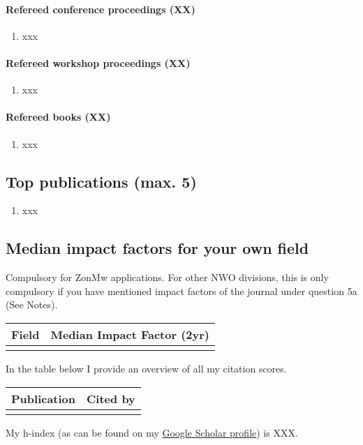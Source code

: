 \paragraph*{Refereed conference proceedings (XX)}

\begin{enumerate}[leftmargin=2.5em]
\setcounter{enumi}{\theenumTemp}
\item xxx
\setcounter{enumTemp}{\theenumi}
\end{enumerate}

\paragraph*{Refereed workshop proceedings (XX)}

\begin{enumerate}[leftmargin=2.5em]
\setcounter{enumi}{\theenumTemp}
\item xxx
\setcounter{enumTemp}{\theenumi}
\end{enumerate}

\paragraph*{Refereed books (XX)}

\begin{enumerate}[leftmargin=2.5em]
\setcounter{enumi}{\theenumTemp}
  \item xxx
\end{enumerate}

\subsection{Top publications {\normalfont (max. 5)}}

\begin{enumerate}
  
  \item xxx

\end{enumerate} 

\subsection{Median impact factors for your own field}
Compulsory for ZonMw applications. For other NWO divisions, this is only
compulsory if you have mentioned impact factors of the journal under question 5a
(See Notes).

\begin{table}[ht!]
\begin{tabular}{p{19em}p{20em}}
\hline
\T\B\textbf{Field}&\textbf{Median Impact Factor (2yr)}\\
\hline
\T  & \\
\hline
\end{tabular}
\end{table}

In the table below I provide an overview of all my citation scores.

\begin{table}[ht!]
\begin{tabular}{p{35em}p{4em}}
\hline
\T\B\textbf{Publication}&\textbf{Cited by}\\
\hline
\T & \\
\hline
\end{tabular}
\end{table}

My h-index (as can be found on my \href{}{Google Scholar profile}) is XXX.
